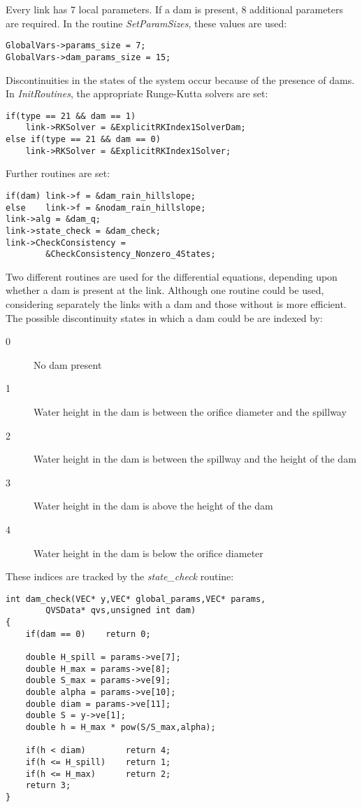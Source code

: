 \documentclass[12pt]{article}
\begin{document}
Every link has 7 local parameters. If a dam is present, 8 additional parameters are required. In the routine \emph{SetParamSizes}, these values are used:
\begin{lstlisting}[style=CStyle]
GlobalVars->params_size = 7;
GlobalVars->dam_params_size = 15;
\end{lstlisting}
Discontinuities in the states of the system occur because of the presence of dams. In \emph{InitRoutines}, the appropriate Runge-Kutta solvers are set:
\begin{lstlisting}[style=CStyle]
if(type == 21 && dam == 1)
	link->RKSolver = &ExplicitRKIndex1SolverDam;
else if(type == 21 && dam == 0)
	link->RKSolver = &ExplicitRKIndex1Solver;
\end{lstlisting}
Further routines are set:
\begin{lstlisting}[style=CStyle]
if(dam)	link->f = &dam_rain_hillslope;
else	link->f = &nodam_rain_hillslope;
link->alg = &dam_q;
link->state_check = &dam_check;
link->CheckConsistency = 
	    &CheckConsistency_Nonzero_4States;
\end{lstlisting}
Two different routines are used for the differential equations, depending upon whether a dam is present at the link. Although one routine could be used, considering separately the links with a dam and those without is more efficient. The possible discontinuity states in which a dam could be are indexed by:
\begin{description}
 \item[0] No dam present
 \item[1] Water height in the dam is between the orifice diameter and the spillway
 \item[2] Water height in the dam is between the spillway and the height of the dam
 \item[3] Water height in the dam is above the height of the dam
 \item[4] Water height in the dam is below the orifice diameter
\end{description}
These indices are tracked by the \emph{state\_check} routine:
\begin{lstlisting}[style=CStyle]
int dam_check(VEC* y,VEC* global_params,VEC* params,
	    QVSData* qvs,unsigned int dam)
{
	if(dam == 0)	return 0;

	double H_spill = params->ve[7];
	double H_max = params->ve[8];
	double S_max = params->ve[9];
	double alpha = params->ve[10];
	double diam = params->ve[11];
	double S = y->ve[1];
	double h = H_max * pow(S/S_max,alpha);

	if(h < diam)		return 4;
	if(h <= H_spill)	return 1;
	if(h <= H_max)		return 2;
	return 3;
}
\end{lstlisting}
\end{document}
